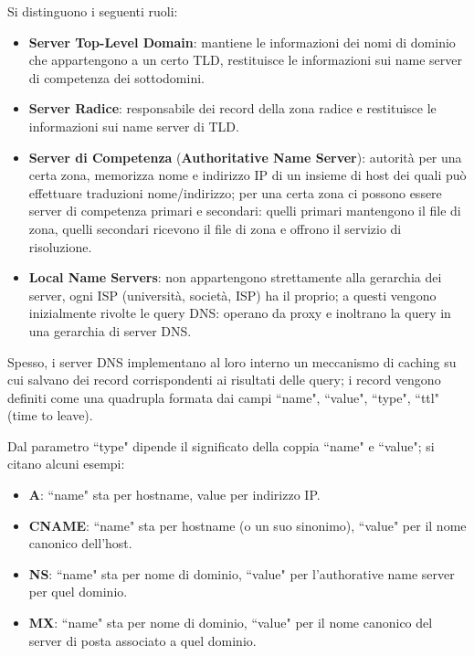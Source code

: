 \documentclass[11pt, italian, openany]{book}
\begin{document}
\begin{sloppypar}
\begin{itemize}[topsep=0pt, itemsep=0pt, parsep=0pt]
	Si distinguono i seguenti ruoli:
	\begin{itemize}[topsep=0pt, itemsep=0pt, parsep=0pt]
		\item \textbf{Server Top-Level Domain}: mantiene le informazioni dei nomi di dominio che appartengono a un certo TLD, restituisce le informazioni
		sui name server di competenza dei sottodomini.
		\item \textbf{Server Radice}: responsabile dei record della zona radice e restituisce le informazioni sui name server di TLD.
		\item \textbf{Server di Competenza} (\textbf{Authoritative Name Server}): autorità per una certa zona, memorizza nome e indirizzo IP di un insieme di
		host dei quali può effettuare traduzioni nome/indirizzo; per una certa zona ci possono essere server di competenza primari e secondari:
		quelli primari mantengono il file di zona, quelli secondari ricevono il file di zona e offrono il servizio di risoluzione.
		\item \textbf{Local Name Servers}: non appartengono strettamente alla gerarchia dei server, ogni ISP (università, società, ISP) ha il proprio; a questi
		vengono inizialmente rivolte le query DNS: operano da proxy e inoltrano la query in una gerarchia di server DNS.
	\end{itemize}

	Spesso, i server DNS implementano al loro interno un meccanismo di caching su cui salvano dei record corrispondenti ai risultati delle query; i record vengono
	definiti come una quadrupla formata dai campi ``name", ``value", ``type", ``ttl" (time to leave).

	Dal parametro ``type" dipende il significato della coppia ``name" e ``value"; si citano alcuni esempi:
	\begin{itemize}[topsep=0pt, itemsep=0pt, parsep=0pt]
		\item \textbf{A}: ``name" sta per hostname, value per indirizzo IP.
		\item \textbf{CNAME}: ``name" sta per hostname (o un suo sinonimo), ``value" per il nome canonico dell'host.
		\item \textbf{NS}: ``name" sta per nome di dominio, ``value" per l'authorative name server per quel dominio.
		\item \textbf{MX}: ``name" sta per nome di dominio, ``value" per il nome canonico del server di posta associato a quel dominio.
	\end{itemize}


\end{itemize}
\end{sloppypar}
\end{document}
